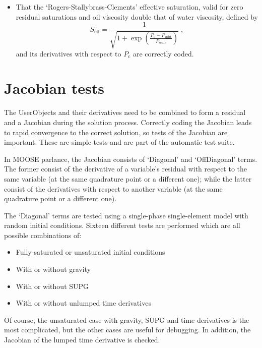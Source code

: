 \documentclass[]{scrreprt}
\begin{document}
\begin{itemize}
\item That the `Rogers-Stallybrass-Clements' effective saturation,
  valid for zero residual saturations and oil viscosity double that of
  water viscosity, defined by
\begin{equation}
S_{\mathrm{eff}} = \frac{1}{\sqrt{1 +
    \exp\left(\frac{P_{\mathrm{c}}-P_{\mathrm{shift}}}{P_{\mathrm{scale}}}\right)}}
\ ,
\end{equation}
and its derivatives with respect to $P_{\mathrm{c}}$ are correctly coded.


\end{itemize}



\chapter{Jacobian tests}
\label{jac}

The UserObjects and their derivatives need to be combined to form a
residual and a Jacobian during the solution process.  Correctly coding
the Jacobian leads to rapid convergence to the correct solution, so
tests of the Jacobian are important.  These are simple tests and are
part of the automatic test suite.

In MOOSE parlance, the Jacobian consists of `Diagonal' and
`OffDiagonal' terms.  The former consist of the derivative of a
variable's residual with respect to the same variable (at the same
quadrature point or a different one); while the latter
consist of the derivatives with respect to another variable (at the
same quadrature point or a different one).

The `Diagonal' terms are tested using a single-phase single-element
model with random initial conditions.  Sixteen different tests are
performed which are all possible combinations of:
\begin{itemize}
\item Fully-saturated or unsaturated initial conditions
\item With or without gravity
\item With or without SUPG
\item With or without unlumped time derivatives
\end{itemize}
Of course, the unsaturated case with gravity, SUPG and time
derivatives is the most complicated, but the other cases are useful
for debugging.  In addition, the Jacobian of the lumped time derivative is checked.
\end{document}
